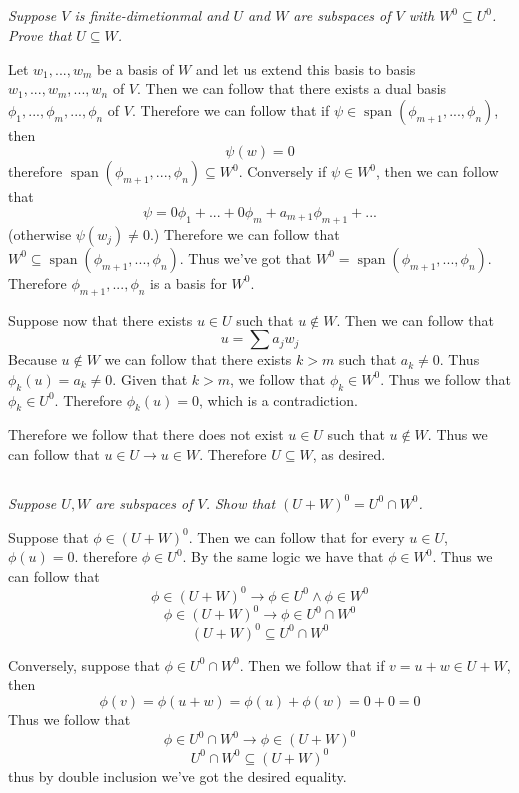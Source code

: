\documentclass[11pt,oneside,titlepage]{book}
\DeclareMathOperator \Span {span}
\begin{document}
\subsection{}

\textit{Suppose $V$ is finite-dimetionmal and $U$ and $W$ are subspaces of $V$ with
  $W^0 \subseteq U^0$. Prove that $U \subseteq W$.}

Let $w_1, ..., w_m$ be a basis of $W$ and let us extend this basis to basis
$w_1, ..., w_m, ..., w_n$ of $V$. Then we can follow that there exists a dual
basis $\phi_1, ..., \phi_m, ..., \phi_n$ of $V$. Therefore we can follow that
if $\psi \in \Span(\phi_{m + 1}, ..., \phi_n)$, then
$$\psi(w) = 0$$
therefore $\Span(\phi_{m + 1}, ..., \phi_n) \subseteq W^0$. Conversely if $\psi \in W^0$, then
we can follow that
$$\psi = 0 \phi_1 + ... + 0 \phi_m + a_{m + 1} \phi_{m + 1} + ...$$
(otherwise $\psi(w_j) \neq 0$.)
Therefore we can follow that $W^0 \subseteq \Span(\phi_{m + 1}, ..., \phi_n)$. Thus
we've got that $W^0 = \Span(\phi_{m + 1}, ..., \phi_n)$. Therefore
$\phi_{m + 1}, ..., \phi_n$ is a basis for $W^0$.

Suppose now that there exists $u \in U$ such that $u \notin W$. Then we can follow that
$$u = \sum{a_j w_j}$$
Because $u \notin W$ we can follow that there exists $k > m$ such that  $a_k \neq 0$.
Thus $\phi_k(u) = a_k \neq 0$. Given that $k > m$, we follow that $\phi_k \in W^0$. Thus we
follow that $\phi_k \in U^0$. Therefore $\phi_k(u) = 0$, which is a contradiction.

Therefore we follow that there does not exist $u \in U$ such that $u \notin W$. Thus
we can follow that $u \in U \to u \in W$. Therefore $U \subseteq W$, as desired.


\subsection{}

\textit{Suppose $U, W$ are subspaces of $V$. Show that $(U + W)^0 = U^0 \cap W^0$.}

Suppose that $\phi \in (U + W)^0$. Then we can follow that for every $u \in U$, $\phi(u) = 0$.
therefore $\phi \in U^0$. By the same logic we have that $\phi \in W^0$. Thus we
can follow that
$$\phi \in (U + W)^0 \to \phi \in U^0 \land \phi \in W^0$$
$$\phi \in (U + W)^0 \to \phi \in U^0 \cap W^0$$
$$(U + W)^0 \subseteq U^0 \cap W^0$$

Conversely, suppose that $\phi \in U^0 \cap W^0$. Then we follow that
if $v = u + w \in U + W$, then
$$\phi(v) = \phi(u + w) = \phi(u) + \phi(w) = 0 + 0 = 0$$
Thus we follow that
$$\phi \in U^0 \cap W^0 \to \phi \in (U + W)^0$$
$$U^0 \cap W^0 \subseteq (U + W)^0$$
thus by double inclusion we've got the desired equality.
\end{document}
